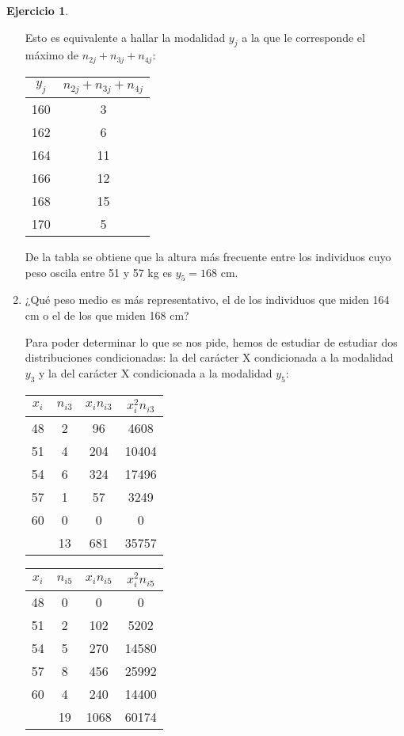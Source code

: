 \documentclass[a4paper, 12pt]{article}
\theoremstyle{definition}
\newtheorem{ej}{Ejercicio}
\begin{document}
\begin{ej}
\begin{enumerate}[label=\alph*)]
Esto es equivalente a hallar la modalidad $y_j$ a la que le corresponde el máximo de $n_{2j}+n_{3j}+n_{4j}$:

\begin{center}
\begin{tabular}{c|c}
	\(y_j\) & \(n_{2j}+n_{3j}+n_{4j}\)\\
	\hline
	160 & 3 \\
	162 & 6\\
	164 & 11\\
	166 & 12\\
	168 & 15\\
	170 & 5\\
\end{tabular}
\end{center}

De la tabla se obtiene que la altura más frecuente entre los individuos cuyo peso oscila entre 51 y 57 kg es $y_5 = 168$ cm.

\item ¿Qué peso medio es más representativo, el de los individuos que miden 164 cm o el de los
que miden 168 cm?

Para poder determinar lo que se nos pide, hemos de estudiar de estudiar dos distribuciones condicionadas: la del carácter X condicionada a la modalidad $y_3$ y la del carácter X condicionada a la modalidad $y_5$:

\begin{center}
\begin{tabular}{c|c|c|c}
	\(x_i\) & \(n_{i3}\) & \(x_i n_{i3}\) & \(x_{i}^{2} n_{i3}\)\\
	\hline
	48 & 2 & 96 & 4608\\
	51 & 4 & 204 & 10404\\
	54 & 6 & 324 & 17496\\
	57 & 1 & 57 & 3249\\
	60 & 0 & 0 & 0\\
	& 13 & 681 & 35757\\
\end{tabular}
\qquad
\begin{tabular}{c|c|c|c}
	\(x_i\) & \(n_{i5}\) & \(x_i n_{i5}\) & \(x_{i}^{2} n_{i5}\)\\
	\hline
	48 & 0 & 0 & 0\\
	51 & 2 & 102 & 5202\\
	54 & 5 & 270 & 14580\\
	57 & 8 & 456 & 25992\\
	60 & 4 & 240 & 14400\\
	& 19 & 1068 & 60174\\
\end{tabular}
\end{center}


\end{enumerate}
\end{ej}
\end{document}
